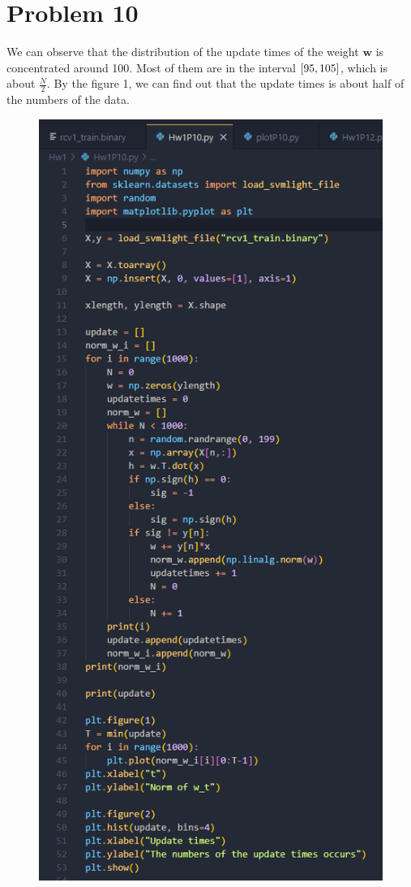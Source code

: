 \documentclass[12pt,a4paper]{article}
\begin{document}
\newpage
\section*{Problem 10}
We can observe that the distribution of the update times of the weight $\bm{w}$ is concentrated around 100.
Most of them are in the interval $\interval{95}{105}$, which is about $\frac{N}{2}$.
By the figure 1, we can find out that the update times is about half of the numbers of the data.
\begin{figure}[hbp]
    \centering
    \begin{minipage}{0.48\linewidth}
        \centering
        \includegraphics[width = \linewidth]{Hw1P10 snapshot.png}

\end{minipage}
\end{figure}
\end{document}
